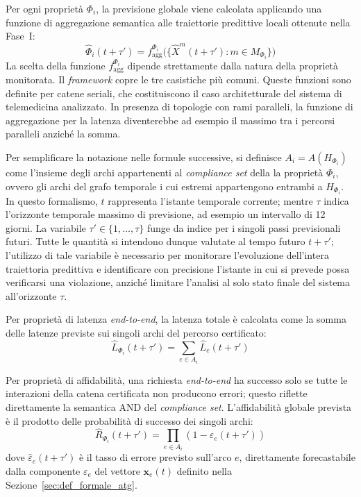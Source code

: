Per ogni proprietà $\Phi_i$, la previsione globale viene calcolata applicando una funzione di
aggregazione semantica alle traiettorie predittive locali ottenute nella Fase~I:
\begin{equation}
\label{eq:global_forecast}
\hat{\Phi}_i(t+\tau') = f_{\text{agg}}^{\Phi_i}\!\bigl(\{\hat{X}^m(t+\tau') : m \in M_{\Phi_i}\}\bigr)
\end{equation}
La scelta della funzione $f_{\text{agg}}^{\Phi_i}$ dipende strettamente dalla natura della
proprietà monitorata. Il \textit{framework} copre le tre casistiche più comuni. Queste funzioni sono
definite per catene seriali, che costituiscono il caso architetturale del sistema di telemedicina
analizzato. In presenza di topologie con rami paralleli, la funzione di aggregazione
per la latenza diventerebbe ad esempio il massimo tra i percorsi paralleli anziché la somma.

Per semplificare la notazione nelle formule successive, si definisce $A_i = A(H_{\Phi_i})$ come 
l'insieme degli archi appartenenti al \textit{compliance set} della la proprietà $\Phi_i$, 
ovvero gli archi del grafo temporale i cui estremi appartengono entrambi a $H_{\Phi_i}$.
In questo formalismo, $t$ rappresenta l'istante temporale corrente; 
mentre $\tau$ indica l'orizzonte temporale massimo di previsione, ad esempio un intervallo di 12 giorni. 
La variabile $\tau' \in \{1, \ldots, \tau\}$ funge da indice per i singoli passi previsionali futuri. 
Tutte le quantità si intendono dunque valutate al tempo futuro $t+\tau'$; l'utilizzo di tale variabile 
è necessario per monitorare l'evoluzione dell'intera traiettoria predittiva e identificare con 
precisione l'istante in cui si prevede possa verificarsi una violazione, anziché limitare 
l'analisi al solo stato finale del sistema all'orizzonte $\tau$.

Per proprietà di latenza \textit{end-to-end}, la latenza totale è calcolata come la somma delle
latenze previste sui singoli archi del percorso certificato:
\begin{equation}
\label{eq:agg_latency}
\hat{L}_{\Phi_i}(t+\tau') = \sum_{e \in A_i} \hat{L}_e(t+\tau')
\end{equation}

Per proprietà di affidabilità, una richiesta \textit{end-to-end} ha successo solo se tutte le
interazioni della catena certificata non producono errori; questo riflette direttamente la semantica
AND del \textit{compliance set}. L'affidabilità globale prevista è il prodotto delle probabilità di
successo dei singoli archi:
\begin{equation}
\label{eq:agg_reliability}
\hat{R}_{\Phi_i}(t+\tau') = \prod_{e \in A_i} (1 - \hat{\varepsilon}_e(t+\tau'))
\end{equation}
dove $\hat{\varepsilon}_e(t+\tau')$ è il tasso di errore previsto sull'arco $e$, direttamente
forecastabile dalla componente $\varepsilon_e$ del vettore $\mathbf{x}_e(t)$ definito nella
Sezione~\ref{sec:def_formale_atg}.

